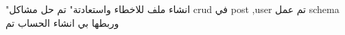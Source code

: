 "انشاء ملف للاخطاء 
واستعادتة"
تم
حل مشاكل crud في post ,user
تم
عمل schema وربطها بي انشاء الحساب
تم